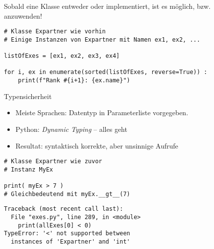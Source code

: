
\begin{frame}[fragile]
%
\begin{hintbox}
Sobald eine Klasse entweder  oder  implementiert, ist es möglich,  bzw.  anzuwenden!
\end{hintbox}
%
\begin{codebox}
\begin{verbatim}
# Klasse Expartner wie vorhin
# Einige Instanzen von Expartner mit Namen ex1, ex2, ...

listOfExes = [ex1, ex2, ex3, ex4]

for i, ex in enumerate(sorted(listOfExes, reverse=True)) :
    print(f"Rank #{i+1}: {ex.name}")
\end{verbatim}
\end{codebox}
%
\end{frame}


\begin{frame}[fragile]{Typensicherheit}
%
\begin{itemize}
\item Meiste Sprachen: Datentyp in Parameterliste vorgegeben.
\item Python: \emph{Dynamic Typing} -- alles geht
\item Resultat: syntaktisch korrekte, aber unsinnige Aufrufe
\end{itemize}
%
\begin{tcbraster}[raster columns=2,
                  raster equal height,
                  nobeforeafter,
                  raster column skip=0.5cm]
\begin{codebox}
\begin{verbatim}
# Klasse Expartner wie zuvor
# Instanz MyEx

print( myEx > 7 )
# Gleichbedeutend mit myEx.__gt__(7)
\end{verbatim}
\end{codebox}
%
\begin{cmdbox}
\begin{verbatim}
Traceback (most recent call last):
  File "exes.py", line 289, in <module>
    print(allExes[0] < 0)
TypeError: '<' not supported between
  instances of 'Expartner' and 'int'
\end{verbatim}
\end{cmdbox}
\end{tcbraster}
%
\end{frame}

